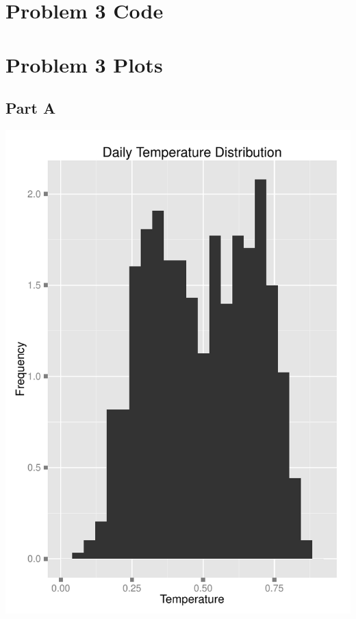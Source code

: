 \documentclass[11pt]{article}
\begin{document}
\section{Problem 3 Code}
\label{sec:problem3code}

\pagebreak

\section{Problem 3 Plots}
\label{sec:problem3plots}
\subsection{Part A}
\label{sec:problem3aplot}
\includegraphics{Problem3A.pdf}
\end{document}
